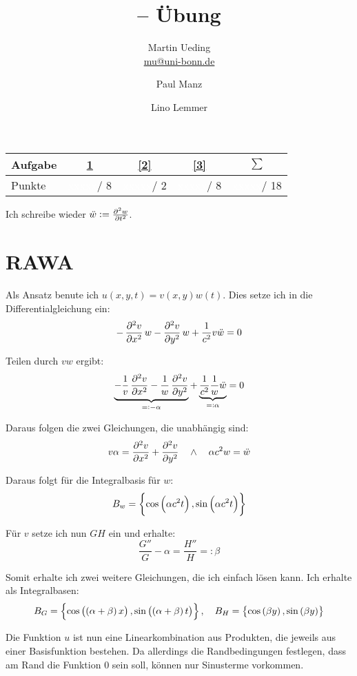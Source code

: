 \documentclass[11pt, ngerman, fleqn]{article}
\title{\themodul{} -- Übung \theuebung \\ \vspace{0.5cm} \large{\thegruppe}}
\author{Martin Ueding \\ \small{\href{mailto:mu@uni-bonn.de}{mu@uni-bonn.de}} \and Paul Manz \and Lino Lemmer}
\newcommand{\punkte}{\textcolor{white}{xxxxx}}
\begin{document}
\maketitle

\begin{table}[h]
	\centering
	\begin{tabular}{l|c|c|c|c}
		Aufgabe & \ref{1} & \ref{2} & \ref{3} & $\sum$   \\
		\hline
		Punkte & \punkte / 8 & \punkte / 2 & \punkte / 8 & \punkte / 18
	\end{tabular}
\end{table}

Ich schreibe wieder $\ddot w := \pd[2] wt$.


\section{RAWA}
\label{1}

Als Ansatz benute ich $u(x, y, t) = v(x, y) w(t)$. Dies setze ich in die Differentialgleichung ein:
\[
	- \dpd[2] vx w - \dpd[2] vy w + \frac{1}{c^2} v \ddot w = 0
\]

Teilen durch $vw$ ergibt:
\[
	\underbrace{- \frac 1v \dpd[2] vx - \frac 1w \dpd[2] vy}_{=: -\alpha} + \underbrace{\frac{1}{c^2} \frac 1w \ddot w}_{=: \alpha} = 0
\]

Daraus folgen die zwei Gleichungen, die unabhängig sind:
\[
	v \alpha = \dpd[2] vx + \dpd[2] vy
	\quad \wedge \quad
	\alpha c^2 w = \ddot w
\]

Daraus folgt für die Integralbasis für $w$:
\[
	B_w = \set{
		\cos\del{\alpha c^2 t}, \sin\del{\alpha c^2 t}
	}
\]

Für $v$ setze ich nun $GH$ ein und erhalte:
\[
	\frac{G''}{G} - \alpha = \frac{H''}{H} =: \beta
\]

Somit erhalte ich zwei weitere Gleichungen, die ich einfach lösen kann. Ich erhalte als Integralbasen:
\[
	B_G = \set{
		\cos\del{\del{\alpha + \beta} x}, \sin\del{\del{\alpha + \beta} t}
	}
	, \quad
	B_H = \set{
		\cos\del{\beta y}, \sin\del{\beta y}
	}
\]

Die Funktion $u$ ist nun eine Linearkombination aus Produkten, die jeweils aus
einer Basisfunktion bestehen. Da allerdings die Randbedingungen festlegen, dass
am Rand die Funktion $0$ sein soll, können nur Sinusterme vorkommen.
\end{document}
